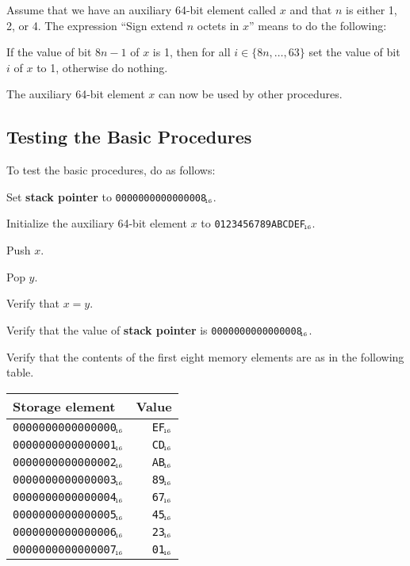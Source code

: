 \documentclass[a4paper,12pt]{article}
\newcommand{\num}[1]{\texttt{#1}\xspace}
\newcommand{\hex}[1]{\num{#1}$_{\textup{\tiny\hskip-1ex 16}}$\xspace}
\newcommand{\SP}{\textbf{stack pointer}\xspace}
\newcommand{\range}[2]{\{#1,\ldots,#2\}}
\begin{document}
Assume that we have an auxiliary 64-bit element called $x$ and that $n$ is either 1, 2, or 4.
The expression ``Sign extend $n$ octets in $x$'' means to do the following:
\begin{stepnumbers}
\item If the value of bit $8n-1$ of $x$ is 1, then for all $i \in \range{8n}{63}$ set the value of bit $i$ of $x$ to 1, otherwise do nothing.
\end{stepnumbers}
The auxiliary 64-bit element $x$ can now be used by other procedures.

\subsection{Testing the Basic Procedures}

To test the basic procedures, do as follows:
\begin{stepnumbers}
\item Set \SP to \hex{0000000000000008}.
\item Initialize the auxiliary 64-bit element $x$ to \hex{0123456789ABCDEF}.
\item Push $x$.
\item Pop $y$.
\item Verify that $x=y$.
\item Verify that the value of \SP is \hex{0000000000000008}.
\item Verify that the contents of the first eight memory elements are as in the following table.
\end{stepnumbers}

\begin{center}
  \begin{tabular}{@{}lr@{}}
    \hline
    Storage element        & Value    \\
    \hline
    \hex{0000000000000000} & \hex{EF} \\
    \hex{0000000000000001} & \hex{CD} \\
    \hex{0000000000000002} & \hex{AB} \\
    \hex{0000000000000003} & \hex{89} \\
    \hex{0000000000000004} & \hex{67} \\
    \hex{0000000000000005} & \hex{45} \\
    \hex{0000000000000006} & \hex{23} \\
    \hex{0000000000000007} & \hex{01} \\
    \hline
  \end{tabular}
\end{center}
\end{document}
